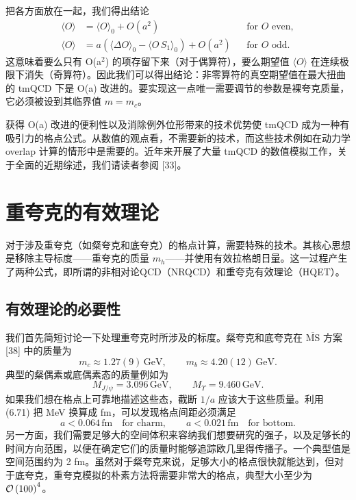 把各方面放在一起，我们得出结论
\begin{equation}
  \begin{aligned}
    \langle O\rangle &= \langle O\rangle_0 + O(a^2)
    && \text{for } O \text{ even} , \\
    \langle O\rangle &= a\left(\langle\Delta O\rangle_0
    - \langle O\,S_1\rangle_0\right) + O(a^2)
    && \text{for } O \text{ odd} .
  \end{aligned}
\end{equation}
这意味着要么只有 O(a$^2$) 的项存留下来（对于偶算符），要么期望值 $\langle O\rangle$ 在连续极限下消失（奇算符）。因此我们可以得出结论：非零算符的真空期望值在最大扭曲的 tmQCD 下是 O(a) 改进的。要实现这一点唯一需要调节的参数是裸夸克质量，它必须被设到其临界值 $m = m_c$。

获得 O(a) 改进的便利性以及消除例外位形带来的技术优势使 tmQCD 成为一种有吸引力的格点公式。从数值的观点看，不需要新的技术，而这些技术例如在动力学 overlap 计算的情形中是需要的。近年来开展了大量 tmQCD 的数值模拟工作，关于全面的近期综述，我们请读者参阅 [33]。

\section{重夸克的有效理论}

对于涉及重夸克（如粲夸克和底夸克）的格点计算，需要特殊的技术。其核心思想是移除主导标度——重夸克的质量 $m_h$——并使用有效拉格朗日量。这一过程产生了两种公式，即所谓的非相对论QCD（NRQCD）和重夸克有效理论（HQET）。

\subsection{有效理论的必要性}

我们首先简短讨论一下处理重夸克时所涉及的标度。粲夸克和底夸克在 $\overline{\mathrm{MS}}$ 方案 [38] 中的质量为
\begin{equation}
  m_c \approx 1.27(9)\,\mathrm{GeV} , \qquad
  m_b \approx 4.20(12)\,\mathrm{GeV} .
\end{equation}
典型的粲偶素或底偶素态的质量例如为
\begin{equation}
  M_{J/\psi} = 3.096\,\mathrm{GeV} , \qquad
  M_{\Upsilon} = 9.460\,\mathrm{GeV} .
\end{equation}
如果我们想在格点上可靠地描述这些态，截断 $1/a$ 应该大于这些质量。利用 (6.71) 把 MeV 换算成 fm，可以发现格点间距必须满足
\begin{equation}
  a < 0.064\,\mathrm{fm} \quad \text{for charm} , \qquad
  a < 0.021\,\mathrm{fm} \quad \text{for bottom} .
\end{equation}
另一方面，我们需要足够大的空间体积来容纳我们想要研究的强子，以及足够长的时间方向范围，以便在确定它们的质量时能够追踪欧几里得传播子。一个典型值是空间范围约为 2 fm。虽然对于粲夸克来说，足够大小的格点很快就能达到，但对于底夸克，重夸克模拟的朴素方法将需要非常大的格点，典型大小至少为 $\mathcal{O}\left(100\right)^4$。


